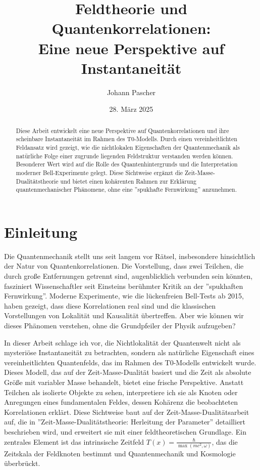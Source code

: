 \documentclass[a4paper,12pt]{article}
\title{Feldtheorie und Quantenkorrelationen: \\Eine neue Perspektive auf Instantaneität}
\author{Johann Pascher}
\date{28. März 2025}
\newcommand{\Tfield}{T(x)}
\theoremstyle{definition}
\theoremstyle{remark}
\begin{document}
	
	\maketitle
	
	\begin{abstract}
		Diese Arbeit entwickelt eine neue Perspektive auf Quantenkorrelationen und ihre scheinbare Instantaneität im Rahmen des T0-Modells. Durch einen vereinheitlichten Feldansatz wird gezeigt, wie die nichtlokalen Eigenschaften der Quantenmechanik als natürliche Folge einer zugrunde liegenden Feldstruktur verstanden werden können. Besonderer Wert wird auf die Rolle des Quantenhintergrunds und die Interpretation moderner Bell-Experimente gelegt. Diese Sichtweise ergänzt die Zeit-Masse-Dualitätstheorie und bietet einen kohärenten Rahmen zur Erklärung quantenmechanischer Phänomene, ohne eine ''spukhafte Fernwirkung'' anzunehmen.
	\end{abstract}
	
	\tableofcontents
	\newpage
	
	\section{Einleitung}
	
	Die Quantenmechanik stellt uns seit langem vor Rätsel, insbesondere hinsichtlich der Natur von Quantenkorrelationen. Die Vorstellung, dass zwei Teilchen, die durch große Entfernungen getrennt sind, augenblicklich verbunden sein könnten, fasziniert Wissenschaftler seit Einsteins berühmter Kritik an der ''spukhaften Fernwirkung''. Moderne Experimente, wie die lückenfreien Bell-Tests ab 2015, haben gezeigt, dass diese Korrelationen real sind und die klassischen Vorstellungen von Lokalität und Kausalität übertreffen. Aber wie können wir dieses Phänomen verstehen, ohne die Grundpfeiler der Physik aufzugeben?
	
	In dieser Arbeit schlage ich vor, die Nichtlokalität der Quantenwelt nicht als mysteriöse Instantaneität zu betrachten, sondern als natürliche Eigenschaft eines vereinheitlichten Quantenfelds, das im Rahmen des T0-Modells entwickelt wurde. Dieses Modell, das auf der Zeit-Masse-Dualität basiert und die Zeit als absolute Größe mit variabler Masse behandelt, bietet eine frische Perspektive. Anstatt Teilchen als isolierte Objekte zu sehen, interpretiere ich sie als Knoten oder Anregungen eines fundamentalen Feldes, dessen Kohärenz die beobachteten Korrelationen erklärt. Diese Sichtweise baut auf der Zeit-Masse-Dualitätsarbeit auf, die in ''Zeit-Masse-Dualitätstheorie: Herleitung der Parameter'' \cite{pascher_params_2025} detailliert beschrieben wird, und erweitert sie mit einer feldtheoretischen Grundlage. Ein zentrales Element ist das intrinsische Zeitfeld \(\Tfield = \frac{\hbar}{\max(m c^2, \omega)}\), das die Zeitskala der Feldknoten bestimmt und Quantenmechanik und Kosmologie überbrückt.
	
\end{document}
